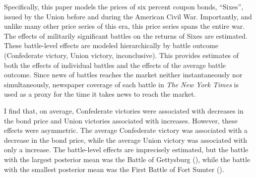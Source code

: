 \documentclass[11pt, oneside, article]{memoir}
\begin{document}
Specifically, this paper models the prices of six percent coupon bonds, ``Sixes'', issued by the Union before and during the American Civil War.
Importantly, and unlike many other price series of this era, this price series spans the entire war.
The effects of \AcwBattleNumSigA{} militarily significant battles on the returns of Sixes are estimated.
These battle-level effects are modeled hierarchically by battle outcome (Confederate victory, Union victory, inconclusive).
This provides estimates of both the effects of individual battles and the effects of the average battle outcome.
Since news of battles reaches the market neither instantaneously nor simultaneously, newspaper coverage of each battle in \textit{The New York Times} is used as a proxy for the time it takes news to reach the market.

I find that, on average, Confederate victories were associated with decreases in the bond price and Union victories associated with  increases.
However, these effects were asymmetric. The average Confederate victory was associated with a \AcwGammaMeanCPct{} decrease in the bond price, while the average Union victory was associated with only a \AcwGammaMeanUPct{} increase.
The battle-level effects are imprecisely estimated, but the battle with the largest posterior mean was the Battle of Gettysburg (\AcwBetaGettysburg{}), while the battle with the smallest posterior mean was the First Battle of Fort Sumter (\AcwBetaFtSumter{}).
\end{document}
